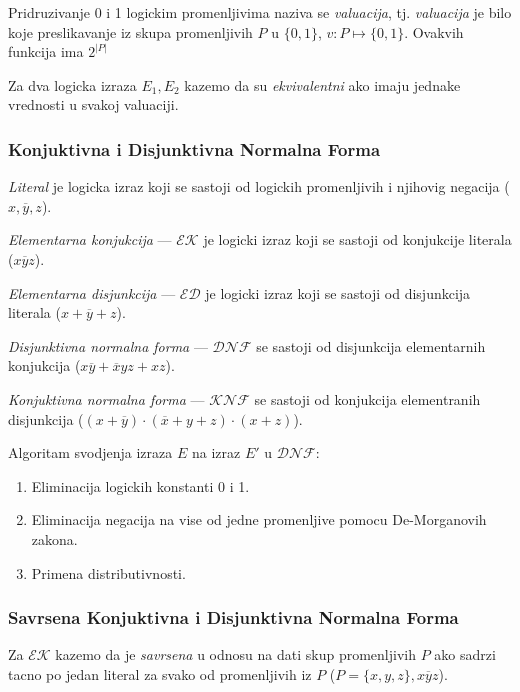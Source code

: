 \documentclass[12p, a4paper]{article}
\begin{document}
\begin{multicols}{2}
    Pridruzivanje 0 i 1 logickim promenljivima naziva se \emph{valuacija}, tj.
    \emph{valuacija} je bilo koje preslikavanje iz skupa promenljivih $P$ u 
    $\{0, 1\}$, $v: P \mapsto \{0, 1\}$. Ovakvih funkcija ima $2^{|P|}$

    Za dva logicka izraza $E_1, E_2$ kazemo da su \emph{ekvivalentni} ako imaju
    jednake vrednosti u svakoj valuaciji.

    \subsubsection{Konjuktivna i Disjunktivna Normalna Forma}

    \emph{Literal} je logicka izraz koji se sastoji od logickih promenljivih i 
    njihovig negacija ($x, \overline{y}, z$).
    
    \emph{Elementarna konjukcija} --- $\mathcal{EK}$ je logicki izraz koji se 
    sastoji od konjukcije literala ($x \overline{y} z$).

    \emph{Elementarna disjunkcija} --- $\mathcal{ED}$ je logicki izraz koji se
    sastoji od disjunkcija literala ($ x + \overline{y} + z$).

    \emph{Disjunktivna normalna forma} --- $\mathcal{DNF}$ se sastoji od 
    disjunkcija elementarnih konjukcija 
    ($x \overline{y} + \overline{x} y z + x z$).

    \emph{Konjuktivna normalna forma} --- $\mathcal{KNF}$ se sastoji od 
    konjukcija elementranih disjunkcija
    ($(x + \overline{y} ) \cdot (\overline{x} + y + z) \cdot (x + z)$).

    Algoritam svodjenja izraza $E$ na izraz $E'$ u $\mathcal{DNF}$:
    \begin{enumerate}
        \itemsep0em
        \item Eliminacija logickih konstanti 0 i 1.
        \item Eliminacija negacija na vise od jedne promenljive pomocu 
              De-Morganovih zakona.
        \item Primena distributivnosti.
    \end{enumerate}

    \subsubsection{Savrsena Konjuktivna i Disjunktivna Normalna Forma}

    Za $\mathcal{EK}$ kazemo da je \emph{savrsena} u odnosu na dati skup
    promenljivih $P$ ako sadrzi tacno po jedan literal za svako od 
    promenljivih iz $P$ ($P = \{x, y, z\}, x \overline{y} z$).


\end{multicols}
\end{document}
